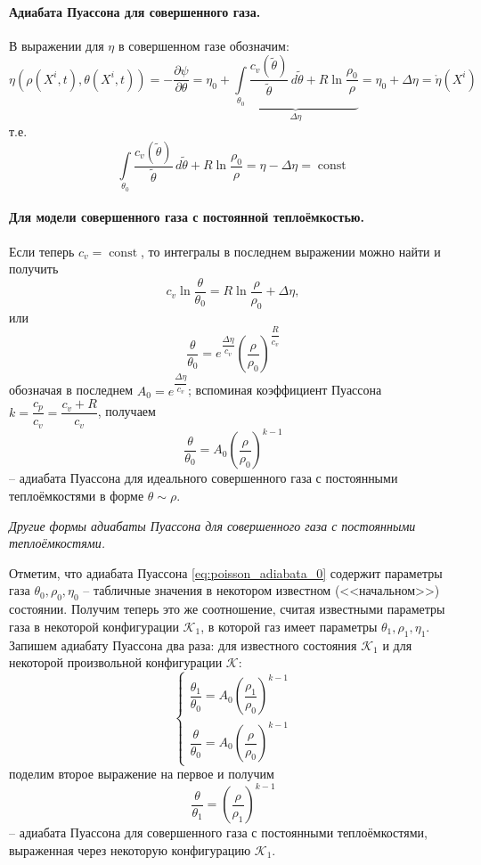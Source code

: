 
\paragraph{Адиабата Пуассона для совершенного газа.}
В выражении для $\eta$ в совершенном газе обозначим:
\[
  \eta\left(\rho(X^i, t), \theta(X^i, t)\right) =
  - \dfrac{\partial \psi}{\partial \theta}  =
  \eta_0 +
  \underbrace{\int\limits_{\theta_0} \dfrac{c_v(\tilde \theta)}{\tilde \theta} \, d\tilde \theta + R \ln \dfrac{\rho_0}{\rho}}_{\Delta \eta} =
  \eta_0 + \Delta \eta =
  \mathring{\eta}(X^i)
\]
т.е.
\[
  \int\limits_{\theta_0} \dfrac{c_v(\tilde \theta)}{\tilde \theta} \, d\tilde \theta + R \ln \dfrac{\rho_0}{\rho} =
  \eta - \Delta \eta =
  \operatorname{const}
\]

\paragraph{Для модели совершенного газа с постоянной теплоёмкостью.}
Если теперь $c_v = \operatorname{const}$, то интегралы в последнем выражении можно найти
и получить
\[
  c_v \ln \dfrac{\theta}{\theta_0} = R \ln \dfrac{\rho}{\rho_0} + \Delta \eta,
\]
или
\[
  \dfrac{\theta}{\theta_0} = e^{\dfrac{\Delta \eta}{c_v}} \left(\dfrac{\rho}{\rho_0}\right)^{\dfrac{R}{c_v}}
\]
обозначая в последнем $A_0 = e^{\dfrac{\Delta\eta}{c_v}}$; вспоминая коэффициент Пуассона $k = \dfrac{c_p}{c_v} = \dfrac{c_v + R}{c_v}$, получаем
\begin{equation}\label{eq:poisson_adiabata_0}
  \dfrac{\theta}{\theta_0} = A_0 \left( \dfrac{\rho}{\rho_0} \right)^{k-1}
\end{equation}
-- адиабата Пуассона для идеального совершенного газа с постоянными теплоёмкостями
в форме $\theta \sim \rho$.

\textit{Другие формы адиабаты Пуассона для совершенного газа с постоянными теплоёмкостями.}

Отметим, что адиабата Пуассона \eqref{eq:poisson_adiabata_0} содержит параметры газа
$\theta_0, \rho_0, \eta_0$ -- табличные значения в некотором известном (<<начальном>>) состоянии.
Получим теперь это же соотношение, считая известными параметры газа в некоторой конфигурации
$\mathcal{K}_1$, в которой газ имеет параметры $\theta_1, \rho_1, \eta_1$. Запишем адиабату
Пуассона два раза: для известного состояния $\mathcal{K}_1$ и для некоторой произвольной
конфигурации $\mathcal{K}$:
\[
  \begin{cases}
    \dfrac{\theta_1}{\theta_0} = A_0 \left( \dfrac{\rho_1}{\rho_0} \right)^{k-1} \\
    \dfrac{\theta}{\theta_0} = A_0 \left( \dfrac{\rho}{\rho_0} \right)^{k-1}
  \end{cases}
\]
поделим второе выражение на первое и получим
\begin{equation}\label{eq:poisson_adiabata_1}
  \dfrac{\theta}{\theta_1} = \left( \dfrac{\rho}{\rho_1} \right)^{k-1}
\end{equation}
-- адиабата Пуассона для совершенного газа с постоянными теплоёмкостями, выраженная через
некоторую конфигурацию $\mathcal{K}_1$.

